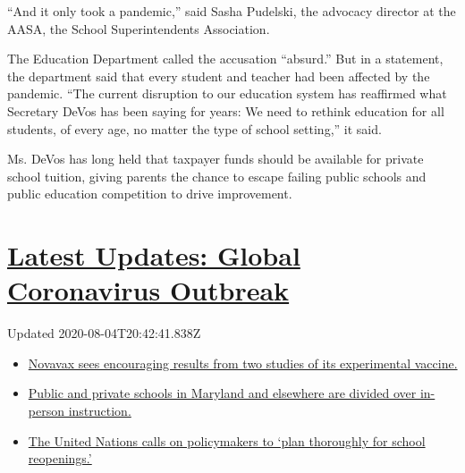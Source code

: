 ``And it only took a pandemic,'' said Sasha Pudelski, the advocacy
director at the AASA, the School Superintendents Association.

The Education Department called the accusation ``absurd.'' But in a
statement, the department said that every student and teacher had been
affected by the pandemic. ``The current disruption to our education
system has reaffirmed what Secretary DeVos has been saying for years: We
need to rethink education for all students, of every age, no matter the
type of school setting,'' it said.

Ms. DeVos has long held that taxpayer funds should be available for
private school tuition, giving parents the chance to escape failing
public schools and public education competition to drive improvement.

\hypertarget{latest-updates-global-coronavirus-outbreak}{%
\section{\texorpdfstring{\href{https://www.nytimes.com/2020/08/04/world/coronavirus-cases.html?action=click\&pgtype=Article\&state=default\&region=MAIN_CONTENT_1\&context=storylines_live_updates}{Latest
Updates: Global Coronavirus
Outbreak}}{Latest Updates: Global Coronavirus Outbreak}}\label{latest-updates-global-coronavirus-outbreak}}

Updated 2020-08-04T20:42:41.838Z

\begin{itemize}
\tightlist
\item
  \href{https://www.nytimes.com/2020/08/04/world/coronavirus-cases.html?action=click\&pgtype=Article\&state=default\&region=MAIN_CONTENT_1\&context=storylines_live_updates\#link-1228a480}{Novavax
  sees encouraging results from two studies of its experimental
  vaccine.}
\item
  \href{https://www.nytimes.com/2020/08/04/world/coronavirus-cases.html?action=click\&pgtype=Article\&state=default\&region=MAIN_CONTENT_1\&context=storylines_live_updates\#link-4825b93}{Public
  and private schools in Maryland and elsewhere are divided over
  in-person instruction.}
\item
  \href{https://www.nytimes.com/2020/08/04/world/coronavirus-cases.html?action=click\&pgtype=Article\&state=default\&region=MAIN_CONTENT_1\&context=storylines_live_updates\#link-50f7386d}{The
  United Nations calls on policymakers to `plan thoroughly for school
  reopenings.'}
\end{itemize}

